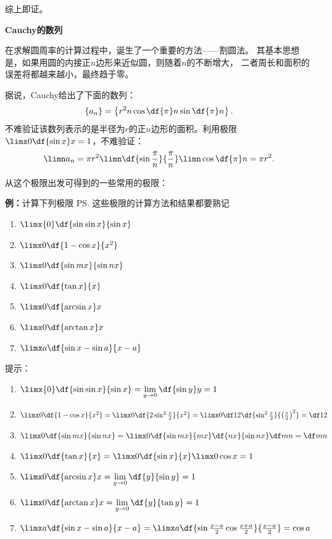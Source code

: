 综上即证。\fin

\begin{shaded}
	{\bf Cauchy的数列}

	在求解圆周率的计算过程中，诞生了一个重要的方法——割圆法。
	其基本思想是，如果用圆的内接正$n$边形来近似圆，则随着$n$的不断增大，
	二者周长和面积的误差将都越来越小，最终趋于零。

	据说，Cauchy给出了下面的数列：
	$$\{a_n\}=\left\{r^2n\cos\df{\pi}n\sin\df{\pi}n\right\}.$$
	不难验证该数列表示的是半径为$r$的正$n$边形的面积。利用极限
	$\limx0\df{\sin x}x=1$，不难验证：
	$$\limn a_n=\pi r^2\limn\df{\sin\frac{\pi}n}
	{\frac{\pi}n}\limn\cos\df{\pi}n=\pi r^2.$$
\end{shaded}

\bs
从这个极限出发可得到的一些常用的极限：

{\bf 例：}计算下列极限
\ps{\baa 这些极限的计算方法和结果都要熟记}
\begin{enumerate}[(1)]
	  \setlength{\itemindent}{1cm}
  \item $\limx{0}\df{\sin\sin x}{\sin x}$ 
  \item $\limx 0\df{1-\cos x}{x^2}$ 
  \item $\limx 0\df{\sin mx}{\sin nx}$
  \item $\limx 0\df{\tan x}{x}$
  \item $\limx 0\df{\arcsin x}x$
  \item $\limx 0\df{\arctan x}x$
  \item $\limx a\df{\sin x-\sin a}{x-a}$
\end{enumerate}

\ifhint
提示：
\begin{enumerate}[(1)]
	\setlength{\itemindent}{1cm}
	\item $\limx{0}\df{\sin\sin x}{\sin x}
	=\lim\limits_{y\to0}\df{\sin y}y=1$ 
	\item $\limx 0\df{1-\cos x}{x^2}
	=\limx 0\df{2\sin^2\frac x2}{x^2}
	=\limx 0\df12\df{\sin^2\frac x2}
	{\left(\frac x2\right)^2}=\df12$ 
	\item $\limx 0\df{\sin mx}{\sin nx}
	=\limx 0\df{\sin mx}{mx}\df{nx}{\sin nx}\df mn=\df mn$
	\item $\limx 0\df{\tan x}{x}
	=\limx 0\df{\sin x}{x}\limx0\cos x=1$
	\item $\limx 0\df{\arcsin x}x
	=\lim\limits_{y\to0}\df{y}{\sin y}=1$
	\item $\limx 0\df{\arctan x}x
	=\lim\limits_{y\to0}\df{y}{\tan y}=1$
	\item $\limx a\df{\sin x-\sin a}{x-a}
	=\limx a\df{\sin\frac{x-a}2\cos\frac{x+a}2}{\frac{x-a}2}=\cos a$
\end{enumerate}
\fi

